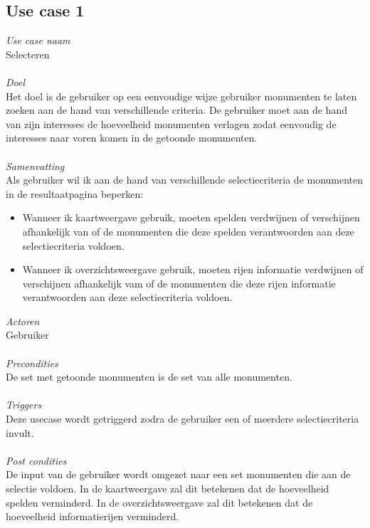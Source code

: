 \documentclass[a4paper,10pt]{article}
\begin{document}
		\subsection{Use case 1}
			\textit{Use case naam}\\
			Selecteren\\ \\
			\textit{Doel}\\
			Het doel is de gebruiker op een eenvoudige wijze gebruiker monumenten te laten zoeken aan de hand van verschillende criteria. De gebruiker moet aan de hand van zijn interesses de hoeveelheid monumenten verlagen zodat eenvoudig de interesses naar voren komen in de getoonde monumenten.\\ \\
			\textit{Samenvatting}\\
			Als gebruiker wil ik aan de hand van verschillende selectiecriteria de monumenten in de resultaatpagina beperken:
			\begin{itemize}
				\item Wanneer ik kaartweergave gebruik, moeten spelden verdwijnen of verschijnen afhankelijk van of de monumenten die deze spelden verantwoorden aan deze selectiecriteria voldoen.
				\item Wanneer ik overzichtsweergave gebruik, moeten rijen informatie verdwijnen of verschijnen afhankelijk vam of de monumenten die deze rijen informatie verantwoorden aan deze selectiecriteria voldoen.
			\end{itemize}
			\textit{Actoren}\\
			Gebruiker\\ \\
			\textit{Precondities}\\
			De set met getoonde monumenten is de set van alle monumenten.\\ \\
			\textit{Triggers}\\
			Deze usecase wordt getriggerd zodra de gebruiker een of meerdere selectiecriteria invult.\\ \\
			\textit{Post condities}\\
			De input van de gebruiker wordt omgezet naar een set monumenten die aan de selectie voldoen. In de kaartweergave zal dit betekenen dat de hoeveelheid spelden verminderd. In de overzichtsweergave zal dit betekenen dat de hoeveelheid informatierijen verminderd.
		
\end{document}
